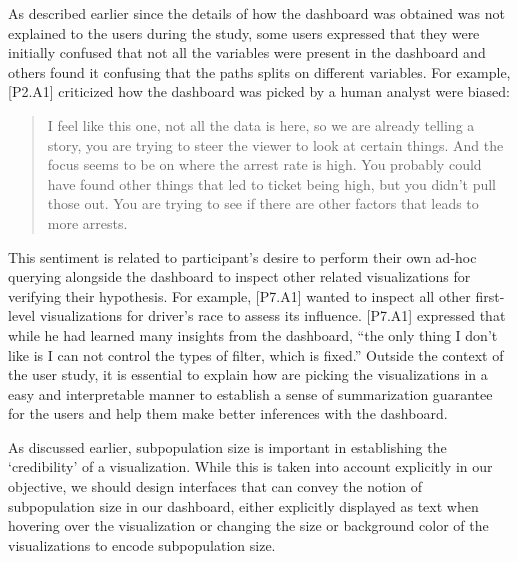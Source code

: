 As described earlier since the details of how the dashboard was obtained was not explained to the users during the study, some users expressed that they were initially confused that not all the variables were present in the dashboard and others found it confusing that the paths splits on different variables. For example, [P2.A1] criticized how the dashboard was picked by a human analyst were biased: 
\begin{quote}
I feel like this one, not all the data is here, so we are already telling a story, you are trying to steer the viewer to look at certain things. And the focus seems to be on where the arrest rate is high. You probably could have found other things that led to ticket being high, but you didn't pull those out. You are trying to see if there are other factors that leads to more arrests.
\end{quote}
\par This sentiment is related to participant's desire to perform their own ad-hoc querying alongside the dashboard to inspect other related visualizations for verifying their hypothesis. For example, [P7.A1] wanted to inspect all other first-level visualizations for driver's race to assess its influence. [P7.A1] expressed that while he had learned many insights from the dashboard, ``the only thing I don't like is I can not control the types of filter, which is fixed.'' Outside the context of the user study, it is essential to explain how \system are picking the visualizations in a easy and interpretable manner to establish a sense of summarization guarantee for the users and help them make better inferences with the dashboard. 
\par As discussed earlier, subpopulation size is important in establishing the `credibility' of a visualization. While this is taken into account explicitly in our objective, we should design interfaces that can convey the notion of subpopulation size in our dashboard, either explicitly displayed as text when hovering over the visualization or changing the size or background color of the visualizations to encode subpopulation size.
